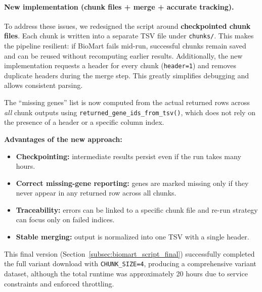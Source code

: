 \documentclass[11pt]{article}
\begin{document}
	\paragraph{New implementation (chunk files + merge + accurate tracking).}
	To address these issues, we redesigned the script around \textbf{checkpointed chunk files}. Each chunk is written into a separate TSV file under \texttt{chunks/}. This makes the pipeline resilient: if BioMart fails mid-run, successful chunks remain saved and can be reused without recomputing earlier results. Additionally, the new implementation requests a header for every chunk (\texttt{header=1}) and removes duplicate headers during the merge step. This greatly simplifies debugging and allows consistent parsing.
	
	The ``missing genes'' list is now computed from the actual returned rows across \emph{all} chunk outputs using \texttt{returned\_gene\_ids\_from\_tsv()}, which does not rely on the presence of a header or a specific column index.
	
	\textbf{Advantages of the new approach:}
	\begin{itemize}
		\item \textbf{Checkpointing:} intermediate results persist even if the run takes many hours.
		\item \textbf{Correct missing-gene reporting:} genes are marked missing only if they never appear in any returned row across all chunks.
		\item \textbf{Traceability:} errors can be linked to a specific chunk file and re-run strategy can focus only on failed indices.
		\item \textbf{Stable merging:} output is normalized into one TSV with a single header.
	\end{itemize}
	
	This final version (Section~\ref{subsec:biomart_script_final}) successfully completed the full variant download with \texttt{CHUNK\_SIZE=4}, producing a comprehensive variant dataset, although the total runtime was approximately 20 hours due to service constraints and enforced throttling.
	
\end{document}
